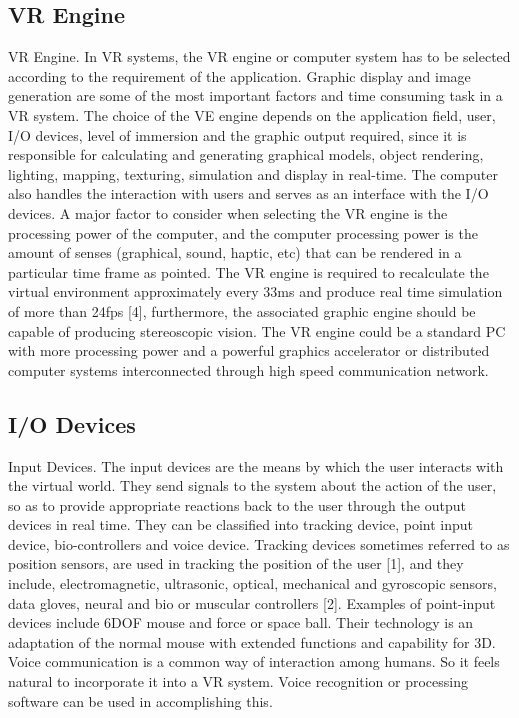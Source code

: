 \subsection{VR Engine}
VR Engine. In VR systems, the VR engine or computer system has to be selected according to the
requirement of the application. Graphic display and image generation are some of the most important factors and time consuming task in a VR system. The choice of the VE engine depends on the application field, user, I/O devices, level of immersion and the graphic output required, since it is responsible for calculating and generating graphical models, object rendering, lighting, mapping, texturing, simulation and display in real-time. The computer also handles the interaction with users and serves as an interface with the I/O devices. A major factor to consider when selecting the VR engine is the processing power of the computer, and the computer processing power is the amount of senses (graphical, sound, haptic, etc) that can be rendered in a particular time frame as pointed. The VR engine is required to recalculate the virtual environment approximately every 33ms and produce real time simulation of more than 24fps [4], furthermore, the associated graphic engine should be capable of producing stereoscopic vision. The VR engine could be a standard PC with more processing power and a powerful graphics accelerator or distributed computer systems interconnected through high speed communication network.


\subsection{I/O Devices}
Input Devices. The input devices are the means by which the user interacts with the virtual world. They send signals to the system about the action of the user, so as to provide appropriate reactions back to the user through the output devices in real time. They can be classified into tracking device, point input device, bio-controllers and voice device. Tracking devices sometimes referred to as position sensors, are used in tracking the position of the user [1], and they include, electromagnetic, ultrasonic, optical, mechanical and gyroscopic sensors, data gloves, neural and bio or muscular controllers [2]. Examples of point-input devices include 6DOF mouse and force or space ball. Their technology is an adaptation of the normal mouse with extended functions and capability for 3D. Voice communication is a common way of interaction among humans. So it feels natural to incorporate it into a VR system. Voice recognition or processing software can be used in accomplishing this.

